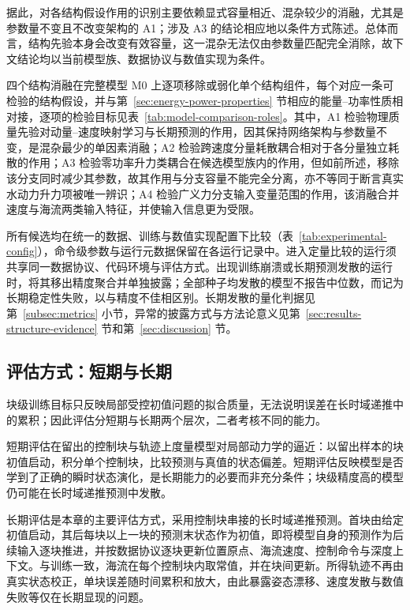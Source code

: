 \documentclass[UTF8,zihao=-4]{ctexrep}
\begin{document}
据此，对各结构假设作用的识别主要依赖显式容量相近、混杂较少的消融，尤其是参数量不变且不改变架构的 A1；涉及 A3 的结论相应地以条件方式陈述。总体而言，结构先验本身会改变有效容量，这一混杂无法仅由参数量匹配完全消除，故下文结论均以当前模型族、数据协议与数值实现为条件。

四个结构消融在完整模型 M0 上逐项移除或弱化单个结构组件，每个对应一条可检验的结构假设，并与第~\ref{sec:energy-power-properties} 节相应的能量--功率性质相对接，逐项的检验目标见表~\ref{tab:model-comparison-roles}。其中，A1 检验物理质量先验对动量--速度映射学习与长期预测的作用，因其保持网络架构与参数量不变，是混杂最少的单因素消融；A2 检验跨速度分量耗散耦合相对于各分量独立耗散的作用；A3 检验零功率升力类耦合在候选模型族内的作用，但如前所述，移除该分支同时减少其参数，故其作用与分支容量不能完全分离，亦不等同于断言真实水动力升力项被唯一辨识；A4 检验广义力分支输入变量范围的作用，该消融合并速度与海流两类输入特征，并使输入信息更为受限。

所有候选均在统一的数据、训练与数值实现配置下比较（表~\ref{tab:experimental-config}），命令级参数与运行元数据保留在各运行记录中。进入定量比较的运行须共享同一数据协议、代码环境与评估方式。出现训练崩溃或长期预测发散的运行时，将其移出精度聚合并单独披露；全部种子均发散的模型不报告中位数，而记为长期稳定性失败，以与精度不佳相区别。长期发散的量化判据见第~\ref{subsec:metrics} 小节，异常的披露方式与方法论意义见第~\ref{sec:results-structure-evidence} 节和第~\ref{sec:discussion} 节。

\subsection{评估方式：短期与长期}
\label{subsec:rollout-eval}

块级训练目标只反映局部受控初值问题的拟合质量，无法说明误差在长时域递推中的累积；因此评估分短期与长期两个层次，二者考核不同的能力。

短期评估在留出的控制块与轨迹上度量模型对局部动力学的逼近：以留出样本的块初值启动，积分单个控制块，比较预测与真值的状态偏差。短期评估反映模型是否学到了正确的瞬时状态演化，是长期能力的必要而非充分条件；块级精度高的模型仍可能在长时域递推预测中发散。

长期评估是本章的主要评估方式，采用控制块串接的长时域递推预测。首块由给定初值启动，其后每块以上一块的预测末状态作为初值，即将模型自身的预测作为后续输入逐块推进，并按数据协议逐块更新位置原点、海流速度、控制命令与深度上下文。与训练一致，海流在每个控制块内取常值，并在块间更新。所得轨迹不再由真实状态校正，单块误差随时间累积和放大，由此暴露姿态漂移、速度发散与数值失败等仅在长期显现的问题。
\end{document}
